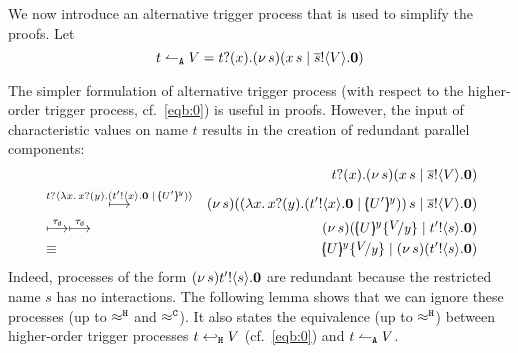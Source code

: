 We now introduce an alternative trigger process
that is used to simplify the proofs. Let
\begin{equation}
	t \leftharpoonup_\mathtt{A} V = t ? (x) . (\nu\, s)(x\, {s} \;|\; \overline{s} ! \langle V \rangle . \mathbf{0})
	\label{eq:ntrig}
\end{equation}

The simpler formulation of alternative trigger process (with respect to the higher-order trigger process, cf.~\eqref{eqb:0}) 
is useful in proofs.
However, the input of characteristic values on name $t$
results in the creation of redundant parallel components:
\begin{eqnarray*}
	&&\newtrigger{t}{V}\\
	&\hby{\bactinp{t}{ \abs{x}{\binp{x}{y} (\bout{t'}{x} \inact \Par \mapchar{U'}{y} )  }} }&
	\newsp{s}{\appl{(\abs{x}{\binp{x}{y} (\bout{t'}{x} \inact \Par \mapchar{U'}{y} ))}}{s} \Par \bout{\dual{s}}{V} \inact}\\
	&\hby{\dtau}\hby{\dtau}
	&\newsp{s}{\mapchar{U}{y} \subst{V}{y} \Par \bout{t'}{s} \inact } \\
	&\scong&
	\mapchar{U}{y} \subst{V}{y} \Par \newsp{s}{\bout{t'}{s} \inact}
\end{eqnarray*}
Indeed, processes 
of the form $(\nu\, s){t' ! \langle s \rangle . \mathbf{0}}$ 
are redundant because the restricted name $s$ has no interactions.
The following  
lemma shows that we can ignore these processes (up to $\approx^\mathtt{H}$ and $\approx^\mathtt{C}$). 
It also states the equivalence (up to $\approx^\mathtt{H}$) between
higher-order trigger processes $t \hookleftarrow_{\mathtt{H}} V$ (cf.~\eqref{eqb:0}) and $t \leftharpoonup_\mathtt{A} V$.
